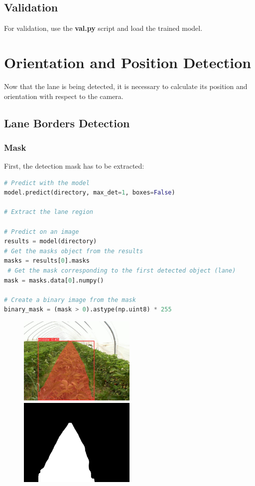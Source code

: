 \documentclass[12pt]{article}
\begin{document}
\subsection{Validation}
For validation, use the \textbf{val.py} script and load the trained model.
\newpage

\section{Orientation and Position Detection}
Now that the lane is being detected, it is necessary to calculate its position and orientation with respect to the camera.

\subsection{Lane Borders Detection}
\subsubsection*{Mask}

First, the detection mask has to be extracted:
\begin{lstlisting}[language=Python]
# Predict with the model
model.predict(directory, max_det=1, boxes=False)

# Extract the lane region

# Predict on an image
results = model(directory) 
# Get the masks object from the results
masks = results[0].masks  
 # Get the mask corresponding to the first detected object (lane)
mask = masks.data[0].numpy() 

# Create a binary image from the mask
binary_mask = (mask > 0).astype(np.uint8) * 255
\end{lstlisting}

\begin{figure}[!h]
	\centering
	\includegraphics[width=0.5\textwidth]{Bilder/detection}%
	\includegraphics[width=0.5\textwidth]{Bilder/binary_mask}%
\end{figure}
\end{document}
